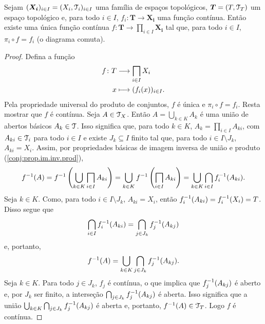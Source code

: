\begin{proposition}
Sejam $(\bm{X_i})_{i \in I} = (X_i,\mathcal{T}_i)_{i \in I}$ uma família de espaços topológicos, $\bm T = (T,\mathcal{T}_T)$ um espaço topológico e, para todo $i \in I$, $f_i: \bm T \to \bm{X_i}$ uma função contínua. Então existe uma única função contínua $f: \bm T \to \prod_{i \in I} \bm{X_i}$ tal que, para todo $i \in I$, $\pi_i \circ f = f_i$ (o diagrama comuta).
\begin{figure}
\centering
{}
\end{figure}
\end{proposition}
\begin{proof}
Defina a função
	\begin{align*}
	\func{f}{T}{ \prod_{i \in I} X_i}{ x}{ (f_i(x))_{i \in I}}.
	\end{align*}
Pela propriedade universal do produto de conjuntos, $f$ é única e $\pi_i \circ f = f_i$. Resta mostrar que $f$ é contínua. Seja $A \in \mathcal{T}_X$. Então $A=\bigcup_{k \in K} A_k$ é uma união de abertos básicos $A_k \in \mathcal{T}$. Isso significa que, para todo $k \in K$, $A_k = \prod_{i \in I} A_{ki}$, com $A_{ki} \in \mathcal{T}_i$ para todo $i \in I$ e existe $J_k \subseteq I$ finito tal que, para todo $i \in I \setminus J_k$, $A_{ki} = X_i$. Assim, por propriedades básicas de imagem inversa de união e produto (\ref{conj:prop.im.inv.prod}),
		\begin{equation*}
		f\inv(A) = f\inv\left(\bigcup_{k \in K}\prod_{i \in I} A_{ki}\right) = \bigcup_{k \in K} f\inv \left( \prod_{i \in I} A_{ki} \right) = \bigcup_{k \in K}\bigcap_{i \in I}f_i\inv(A_{ki}).
		\end{equation*}
Seja $k \in K$. Como, para todo $i \in I \setminus J_k$, $A_{ki} = X_i$, então $f_i^{-1}(A_{ki}) = f_i^{-1}(X_i) = T$. Disso segue que
	\begin{equation*}
	\bigcap_{i \in I}f_i^{-1}(A_{ki}) = \bigcap_{j \in J_k}f_j^{-1}(A_{kj})
	\end{equation*}
e, portanto,
	\begin{equation*}
	f^{-1}(A) = \bigcup_{k \in K}\bigcap_{j \in J_k}f_j^{-1}(A_{kj}).
	\end{equation*}
Seja $k \in K$. Para todo $j \in J_k$, $f_j$ é contínua, o que implica que $f_j^{-1}(A_{kj})$ é aberto e, por $J_k$ ser finito, a interseção $\bigcap_{j \in J_k}f_j^{-1}(A_{kj})$ é aberta. Isso significa que a união $\bigcup_{k \in K}\bigcap_{j \in J_k}f_j^{-1}(A_{kj})$ é aberta e, portanto, $f^{-1}(A) \in \mathcal{T}_T$. Logo $f$ é contínua.
\end{proof}

